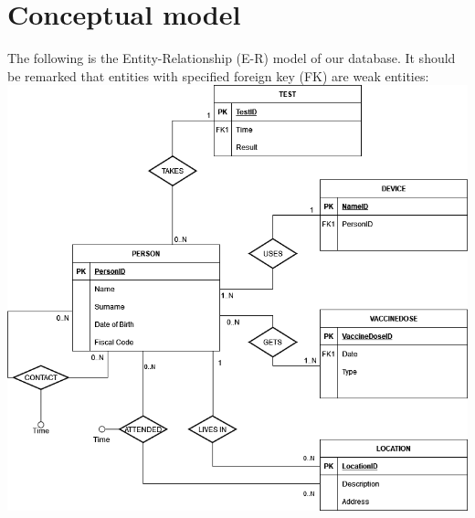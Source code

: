 \documentclass{article}
\begin{document}
\section{Conceptual model}
The following is the Entity-Relationship (E-R) model of our database. It should be remarked that entities with specified foreign key (FK) are weak entities:
\includegraphics[scale=0.5]{images/e-r.png}
\end{document}
